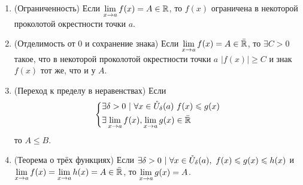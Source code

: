 \begin{enumerate}
	\item (Ограниченность) Если $\lim\limits_{x \rightarrow a} f(x) = A \in \mathbb{R}$, то $f(x)$ ограничена в некоторой проколотой окрестности точки $a$.
	
	\item (Отделимость от 0 и сохранение знака) Если $\lim\limits_{x \rightarrow a} f(x) = A \in \bar{\mathbb{R}}$, то $\exists C > 0$ такое, что в некоторой проколотой окрестности точки $a$ $|f(x)| \ge C$ и знак $f(x)$ тот же, что и у $A$.
	
	\item (Переход к пределу в неравенствах) Если 
	$$
	\left\{\begin{aligned}
		&{\exists \delta > 0\ |\ \forall x \in \mathring{U}_{\delta}(a)\ f(x) \leqslant g(x)}
		\\
		&{\exists \lim\limits_{x \rightarrow a} f(x), \lim\limits_{x \rightarrow a} g(x) \in \bar{\mathbb{R}}}
	\end{aligned}\right.
	$$
	то $A \le B$.
	
	\item (Теорема о трёх функциях) Если $\exists \delta > 0\ |\ \forall x \in \mathring{U}_{\delta}(a),\ f(x) \leqslant g(x) \leqslant h(x)$ и $\lim\limits_{x \rightarrow a} f(x) = \lim\limits_{x \rightarrow a} h(x) = A \in \bar{\mathbb{R}}$, то $\lim\limits_{x \rightarrow a} g(x) = A$.
\end{enumerate}

